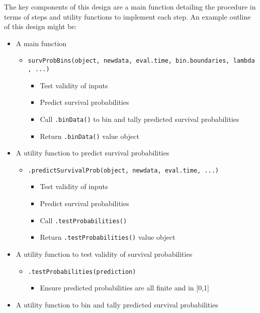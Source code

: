 \documentclass[
]{book}
\providecommand{\tightlist}{%
  \setlength{\itemsep}{0pt}\setlength{\parskip}{0pt}}
\begin{document}
The key components of this design are a main function detailing the procedure in terms of steps and utility functions to implement each step. An example outline of this design might be:

\begin{itemize}
\tightlist
\item
  A main function

  \begin{itemize}
  \tightlist
  \item
    \texttt{survProbBins(object,\ newdata,\ eval.time,\ bin.boundaries,\ lambda,\ ...)}

    \begin{itemize}
    \tightlist
    \item
      Test validity of inputs
    \item
      Predict survival probabilities
    \item
      Call \texttt{.binData()} to bin and tally predicted survival probabilities
    \item
      Return \texttt{.binData()} value object
    \end{itemize}
  \end{itemize}
\item
  A utility function to predict survival probabilities

  \begin{itemize}
  \tightlist
  \item
    \texttt{.predictSurvivalProb(object,\ newdata,\ eval.time,\ ...)}

    \begin{itemize}
    \tightlist
    \item
      Test validity of inputs
    \item
      Predict survival probabilities
    \item
      Call \texttt{.testProbabilities()}
    \item
      Return \texttt{.testProbabilities()} value object
    \end{itemize}
  \end{itemize}
\item
  A utility function to test validity of survival probabilities

  \begin{itemize}
  \tightlist
  \item
    \texttt{.testProbabilities(prediction)}

    \begin{itemize}
    \tightlist
    \item
      Ensure predicted probabilities are all finite and in {[}0,1{]}
    \end{itemize}
  \end{itemize}
\item
  A utility function to bin and tally predicted survival probabilities


\end{itemize}
\end{document}
